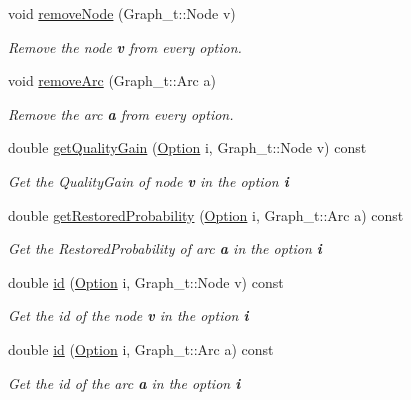 \begin{DoxyCompactItemize}
void \hyperlink{class_restoration_plan2_acd618be603d5562d48c0ece65210750f}{remove\+Node} (Graph\+\_\+t\+::\+Node v)
\begin{DoxyCompactList}\small\item\em Remove the node {\bfseries v} from every option. \end{DoxyCompactList}\item 
void \hyperlink{class_restoration_plan2_aacd1be30356c999259bb98c2869bbb95}{remove\+Arc} (Graph\+\_\+t\+::\+Arc a)
\begin{DoxyCompactList}\small\item\em Remove the arc {\bfseries a} from every option. \end{DoxyCompactList}\item 
double \hyperlink{class_restoration_plan2_a55e84c9117d460224ea5e30f77e13b16}{get\+Quality\+Gain} (\hyperlink{class_restoration_plan2_aff164a2726831342bf87af5e11df1064}{Option} i, Graph\+\_\+t\+::\+Node v) const
\begin{DoxyCompactList}\small\item\em Get the Quality\+Gain of node {\bfseries v} in the option {\bfseries i} \end{DoxyCompactList}\item 
double \hyperlink{class_restoration_plan2_a22980a28d0904266602a16542fa75110}{get\+Restored\+Probability} (\hyperlink{class_restoration_plan2_aff164a2726831342bf87af5e11df1064}{Option} i, Graph\+\_\+t\+::\+Arc a) const
\begin{DoxyCompactList}\small\item\em Get the Restored\+Probability of arc {\bfseries a} in the option {\bfseries i} \end{DoxyCompactList}\item 
double \hyperlink{class_restoration_plan2_ab57f10bed72f50c27438e6dc06f57ca6}{id} (\hyperlink{class_restoration_plan2_aff164a2726831342bf87af5e11df1064}{Option} i, Graph\+\_\+t\+::\+Node v) const
\begin{DoxyCompactList}\small\item\em Get the id of the node {\bfseries v} in the option {\bfseries i} \end{DoxyCompactList}\item 
double \hyperlink{class_restoration_plan2_a8967a613c2f9cbabb2418217abfe8e74}{id} (\hyperlink{class_restoration_plan2_aff164a2726831342bf87af5e11df1064}{Option} i, Graph\+\_\+t\+::\+Arc a) const
\begin{DoxyCompactList}\small\item\em Get the id of the arc {\bfseries a} in the option {\bfseries i} \end{DoxyCompactList}\item 

\end{DoxyCompactItemize}

